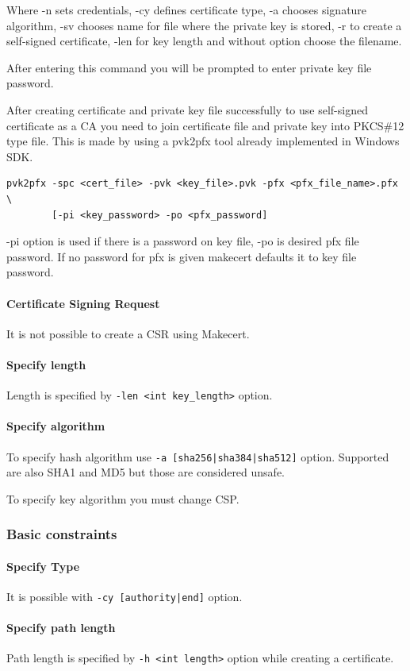 \documentclass[10pt, a4paper]{report}
\begin{document}
Where -n sets credentials, -cy defines certificate type, -a chooses signature algorithm, -sv chooses name for file where the private key is stored, -r to create a self-signed certificate, -len for key length and without option choose the filename.

After entering this command you will be prompted to enter private key file password.

After creating certificate and private key file successfully to use self-signed certificate as a CA you need to join certificate file and private key into PKCS\#12 type file. This is made by using a pvk2pfx tool already implemented in Windows SDK.
\begin{verbatim}
pvk2pfx -spc <cert_file> -pvk <key_file>.pvk -pfx <pfx_file_name>.pfx \
        [-pi <key_password> -po <pfx_password]
\end{verbatim}

-pi option is used if there is a password on key file, -po is desired pfx file password. If no password for pfx is given makecert defaults it to key file password.


      \paragraph{Certificate Signing Request}
It is not possible to create a CSR using Makecert.
      \paragraph{Specify length}
Length is specified by \verb+-len <int key_length>+ option.
      \paragraph{Specify algorithm}
To specify hash algorithm use \verb+-a [sha256|sha384|sha512]+ option. Supported are also SHA1 and MD5 but those are considered unsafe.

To specify key algorithm you must change CSP.
    \subsubsection{Basic constraints}
    
      \paragraph{Specify Type}
It is possible with \verb+-cy [authority|end]+ option.
      \paragraph{Specify path length}
Path length is specified by \verb+-h <int length>+ option while creating a certificate.
\end{document}
